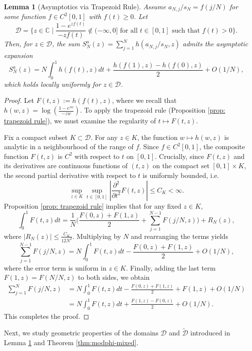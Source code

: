 \documentclass[11pt,a4paper]{scrartcl}
\numberwithin{equation}{section}
\theoremstyle{plain}
\newtheorem{lemma}{Lemma}[section]
\theoremstyle{definition}
\theoremstyle{remark}
\begin{document}
\begin{lemma}[Asymptotics via Trapezoid Rule]\label{lem: asymptotics E-M}
Assume $a_{N,j}/s_N = f(j/N)$ for some function $f \in C^2[0, 1]$ with $f(t) \ge 0$.
Let
$$
\mathscr{D} = \Big\{z \in \mathbb{C} \mid \frac{1-e^{zf(t)}}{-zf(t)} \notin (-\infty, 0] \text{ for all } t \in [0, 1] \text{ such that } f(t) > 0\Big\}.
$$
Then, for $z \in \mathscr{D}$, the sum $S_N^a(z) = \sum_{j=1}^N h(a_{N,j}/s_N, z)$ admits the asymptotic expansion
\[
S_N^a(z) = N \int_0^1 h(f(t), z) dt + \frac{h(f(1), z) - h(f(0), z)}{2} + O(1/N),
\]
which holds locally uniformly for $z \in \mathscr{D}$.
\end{lemma}

\begin{proof}
Let $F(t,z) := h(f(t),z)$, where we recall that $h(w,z) = \log(\frac{1-e^{zw}}{-zw})$. To apply the trapezoid rule (Proposition \ref{prop: trapezoid rule}), we must examine the regularity of $t \mapsto F(t,z)$.

Fix a compact subset $K \subset \mathscr{D}$. For any $z \in K$, the function $w \mapsto h(w,z)$ is analytic in a neighbourhood of the range of $f$. Since $f \in C^2[0,1]$, the composite function $F(t,z)$ is $C^2$ with respect to $t$ on $[0,1]$. Crucially, since $F(t,z)$ and its derivatives are continuous functions of $(t,z)$ on the compact set $[0,1] \times K$, the second partial derivative with respect to $t$ is uniformly bounded, i.e.
\[
\sup_{z \in K} \sup_{t \in [0,1]} \left| \frac{\partial^2}{\partial t^2} F(t,z) \right| \le C_K < \infty.
\]
Proposition \ref{prop: trapezoid rule} implies that for any fixed $z \in K$,
\[
\int_0^1 F(t, z) dt = \frac{1}{N}\Big(\frac{F(0, z) + F(1, z)}{2} + \sum_{j=1}^{N-1} F(j/N, z)\Big) + R_N(z),
\]
where $|R_N(z)| \le \frac{C_K}{12 N^2}$. Multiplying by $N$ and rearranging the terms yields
\[
\sum_{j=1}^{N-1} F(j/N, z) = N \int_0^1 F(t, z) dt - \frac{F(0, z) + F(1, z)}{2} + O(1/N),
\]
where the error term is uniform in $z \in K$. Finally, adding the last term $F(1,z) = F(N/N, z)$ to both sides, we obtain
\begin{align*}
	\sum_{j=1}^{N} F(j/N, z) &= N \int_0^1 F(t, z) dt - \frac{F(0, z) + F(1, z)}{2} + F(1,z) + O(1/N) \\
	&= N \int_0^1 F(t, z) dt + \frac{F(1, z) - F(0, z)}{2} + O(1/N).
\end{align*}
This completes the proof.
\end{proof}

Next, we study geometric properties of the domains $\mathscr{D}$ and $\widetilde{\mathscr{D}}$ introduced in Lemma \ref{lem: asymptotics E-M} and Theorem \ref{thm:modphi-mixed}.
\end{document}
